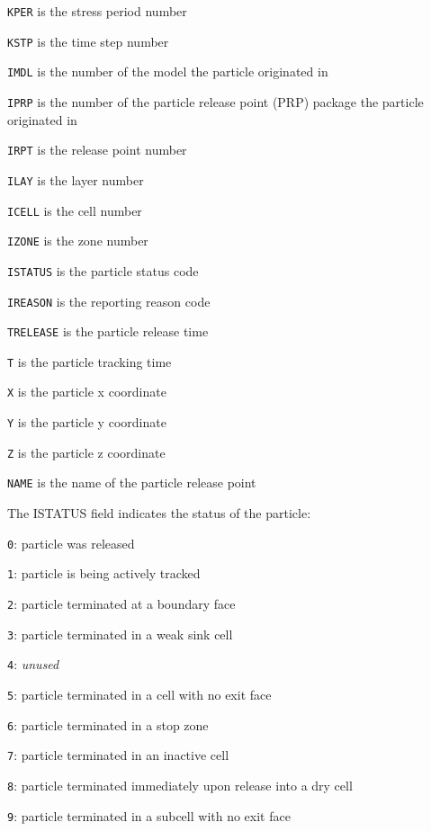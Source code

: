 \begin{description} \itemsep0pt \parskip0pt 
\item \texttt{KPER} is the stress period number
\item \texttt{KSTP} is the time step number
\item \texttt{IMDL} is the number of the model the particle originated in
\item \texttt{IPRP} is the number of the particle release point (PRP) package the particle originated in
\item \texttt{IRPT} is the release point number
\item \texttt{ILAY} is the layer number
\item \texttt{ICELL} is the cell number
\item \texttt{IZONE} is the zone number
\item \texttt{ISTATUS} is the particle status code
\item \texttt{IREASON} is the reporting reason code
\item \texttt{TRELEASE} is the particle release time
\item \texttt{T} is the particle tracking time
\item \texttt{X} is the particle x coordinate
\item \texttt{Y} is the particle y coordinate
\item \texttt{Z} is the particle z coordinate
\item \texttt{NAME} is the name of the particle release point
\end{description}

The ISTATUS field indicates the status of the particle:

\begin{description} \itemsep0pt \parskip0pt 
\item \texttt{0}: particle was released
\item \texttt{1}: particle is being actively tracked
\item \texttt{2}: particle terminated at a boundary face
\item \texttt{3}: particle terminated in a weak sink cell
\item \texttt{4}: \textit{unused}
\item \texttt{5}: particle terminated in a cell with no exit face
\item \texttt{6}: particle terminated in a stop zone
\item \texttt{7}: particle terminated in an inactive cell
\item \texttt{8}: particle terminated immediately upon release into a dry cell
\item \texttt{9}: particle terminated in a subcell with no exit face
\end{description}

